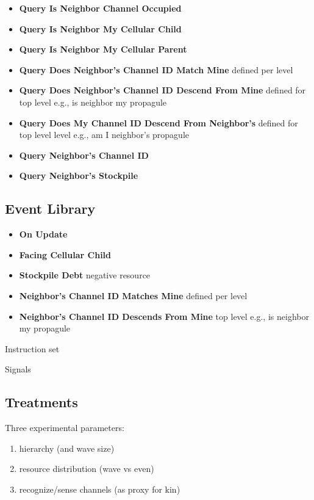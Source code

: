 \begin{itemize}
\item \textbf{Query Is Neighbor Channel Occupied}
\item \textbf{Query Is Neighbor My Cellular Child}
\item \textbf{Query Is Neighbor My Cellular Parent}
\item \textbf{Query Does Neighbor's Channel ID Match Mine} defined per level
\item \textbf{Query Does Neighbor's Channel ID Descend From Mine} defined for top level e.g., is neighbor my propagule
\item \textbf{Query Does My Channel ID Descend From Neighbor's} defined for top level level e.g., am I neighbor's propagule
\item \textbf{Query Neighbor's Channel ID}
\item \textbf{Query Neighbor's Stockpile}
\end{itemize}


\subsection{Event Library}

\begin{itemize}
\item \textbf{On Update}
\item \textbf{Facing Cellular Child}
\item \textbf{Stockpile Debt} negative resource
\item \textbf{Neighbor's Channel ID Matches Mine} defined per level
\item \textbf{Neighbor's Channel ID Descends From Mine} top level
e.g., is neighbor my propagule
\end{itemize}

Instruction set

Signals

\subsection{Treatments}

Three experimental parameters:
\begin{enumerate}
\item hierarchy (and wave size)
\item resource distribution (wave vs even)
\item recognize/sense channels (as proxy for kin)
\end{enumerate}

